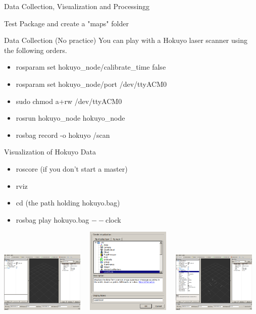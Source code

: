 \documentclass[10pt]{beamer}
\begin{document}
\begin{frame}[allowframebreaks]{Data Collection, Visualization and Processingg}
\begin{block}{Test Package and create a "maps" folder}
\begin{itemize}
	  	\end{itemize}
  \end{block}
  \begin{block}{Data Collection (No practice)}
   You can play with a Hokuyo laser scanner using the following orders.
   \begin{itemize}
    \item rosparam set hokuyo\_node/calibrate\_time false
    \item rosparam set hokuyo\_node/port /dev/ttyACM0
    \item sudo chmod a+rw /dev/ttyACM0
    \item rosrun hokuyo\_node hokuyo\_node
    \item rosbag record -o hokuyo /scan
   \end{itemize}
  \end{block}
  \begin{block}{Visualization of Hokuyo Data}
   \begin{itemize}
    \item roscore (if you don't start a master)
    \item rviz
    \item cd (the path holding hokuyo.bag)
    \item rosbag play hokuyo.bag $--$clock
   \end{itemize}
   \begin{center}
    \includegraphics[width=0.3\textwidth]{rviz.png}~~
    \includegraphics[width=0.3\textwidth]{topics.png}~~
    \includegraphics[width=0.3\textwidth]{scan.png}
   \end{center}
  \end{block}
  

\end{frame}
\end{document}
